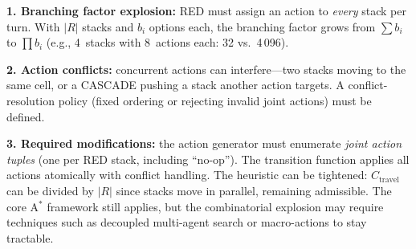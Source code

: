 \documentclass[runningheads]{llncs}
\begin{document}
\textbf{1. Branching factor explosion:} RED must assign an action to \emph{every} stack per turn. With $|R|$ stacks and $b_i$ options each, the branching factor grows from $\sum b_i$ to $\prod b_i$ (e.g., 4~stacks with 8~actions each: 32 vs.\ 4\,096).

\textbf{2. Action conflicts:} concurrent actions can interfere---two stacks moving to the same cell, or a CASCADE pushing a stack another action targets. A conflict-resolution policy (fixed ordering or rejecting invalid joint actions) must be defined.

\textbf{3. Required modifications:} the action generator must enumerate \emph{joint action tuples} (one per RED stack, including ``no-op''). The transition function applies all actions atomically with conflict handling. The heuristic can be tightened: $C_{\text{travel}}$ can be divided by $|R|$ since stacks move in parallel, remaining admissible. The core A$^*$ framework still applies, but the combinatorial explosion may require techniques such as decoupled multi-agent search or macro-actions to stay tractable.




\end{document}
